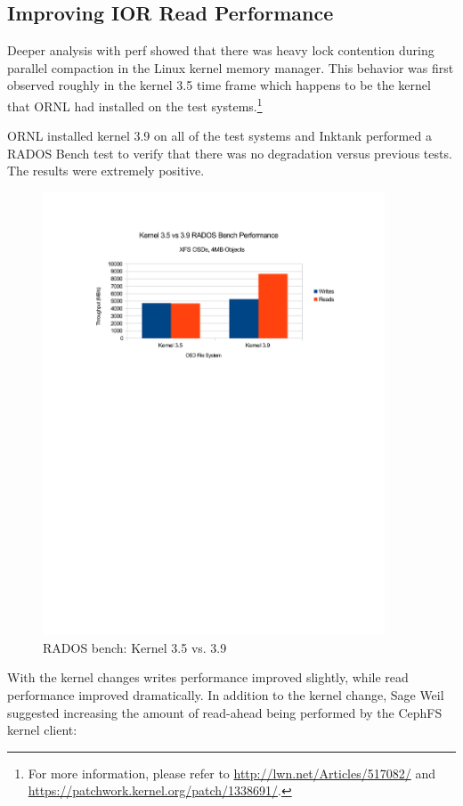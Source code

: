 \documentclass{article}
\begin{document}
\subsection{Improving IOR Read Performance}

Deeper analysis with perf showed that there was heavy lock contention during
parallel compaction in the Linux kernel memory manager.  This behavior was first
observed roughly in the kernel 3.5 time frame which happens to be the kernel
that ORNL had installed on the test systems.\footnote{For more information,
please refer to \url{http://lwn.net/Articles/517082/} and
\url{https://patchwork.kernel.org/patch/1338691/}.}

ORNL installed kernel 3.9 on all of the test systems and Inktank performed a
RADOS Bench test to verify that there was no degradation versus previous tests.  The
results were extremely positive.


\begin{figure}[htb]
\centering
\includegraphics[width=4in]{rados-kernel-35vs39}
\caption{RADOS bench: Kernel 3.5 vs. 3.9}
\label{fig:rados-kernel}
\end{figure}



With the kernel changes writes performance improved slightly, while read
performance improved dramatically.  In addition to the kernel change, Sage Weil
suggested increasing the amount of read-ahead being performed by the CephFS
kernel client:
\end{document}

